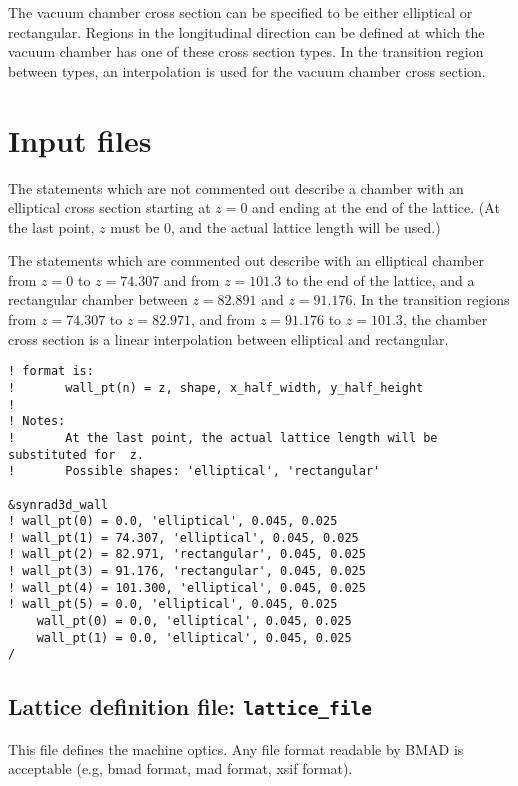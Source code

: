 \documentclass[11pt,landscape]{article}
\begin{document}
The vacuum chamber cross section can be specified to be either
elliptical or rectangular. Regions in the longitudinal direction can
be defined at which the vacuum chamber has one of these cross section
types. In the transition region between types, an interpolation is
used for the vacuum chamber cross section.  

\section{Input files}

The statements which are not commented out describe a chamber with an
elliptical cross section starting at $z=0$ and ending at the end of
the lattice. (At the last point, $z$ must be 0, and the actual lattice
length will be used.)

The statements which are commented out describe with an elliptical
chamber from $z=0$ to $z=74.307$ and from $z=101.3$ to the end of the
lattice, and a rectangular chamber between $z=82.891$ and
$z=91.176$. In the transition regions from $z=74.307$ to $z=82.971$,
and from $z=91.176$ to $z=101.3$, the chamber cross section is a
linear interpolation between elliptical and rectangular.
\begin{verbatim}
! format is:
!		wall_pt(n) = z, shape, x_half_width, y_half_height
!
! Notes:
!		At the last point, the actual lattice length will be substituted for  z.
!		Possible shapes: 'elliptical', 'rectangular'

&synrad3d_wall
! wall_pt(0) = 0.0, 'elliptical', 0.045, 0.025
! wall_pt(1) = 74.307, 'elliptical', 0.045, 0.025
! wall_pt(2) = 82.971, 'rectangular', 0.045, 0.025
! wall_pt(3) = 91.176, 'rectangular', 0.045, 0.025
! wall_pt(4) = 101.300, 'elliptical', 0.045, 0.025
! wall_pt(5) = 0.0, 'elliptical', 0.045, 0.025
    wall_pt(0) = 0.0, 'elliptical', 0.045, 0.025
    wall_pt(1) = 0.0, 'elliptical', 0.045, 0.025
/
\end{verbatim}


\subsection{Lattice definition file: \texttt{lattice\_file}} This file
defines the machine optics. Any file format readable by BMAD is
acceptable (e.g, bmad format, mad format, xsif format).

\end{document}
